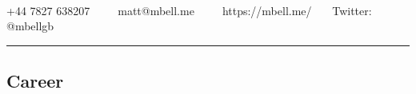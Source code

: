 \documentclass[11pt,a4paper]{article}
\begin{document}
\begin{center}
{\Huge {}}\\


+44 7827 638207\ \ \textbullet\
\ \ matt@mbell.me\ \ \textbullet\
\ \ https://mbell.me/ \textbullet\
\ \ Twitter: @mbellgb
\end{center}


\hrule
\vspace{-1.2em}
\subsection*{Career}
\end{document}

